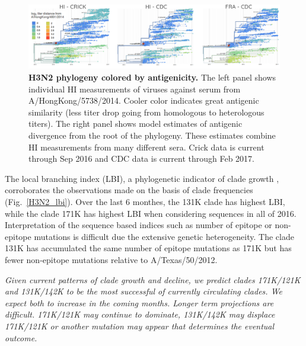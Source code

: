 \documentclass[11pt,oneside,letterpaper]{article}
\begin{document}
\begin{figure}[h!]
	\centering
	\includegraphics[width=1.0\textwidth]{../figures/feb-2017/H3N2_tree_titer_model.png}
	\caption{\textbf{H3N2 phylogeny colored by antigenicity.}
	The left panel shows individual HI measurements of viruses against serum from A/HongKong/5738/2014.
	Cooler color indicates great antigenic similarity (less titer drop going from homologous to heterologous titers).
	The right panel shows model estimates of antigenic divergence from the root of the phylogeny.
	These estimates combine HI measurements from many different sera.
	Crick data is current through Sep 2016 and CDC data is current through Feb 2017.
	}
	\label{H3N2_tree_titer_model}
\end{figure}

The local branching index (LBI), a phylogenetic indicator of clade growth \cite{neher2014predicting}, corroborates the observations made on the basis of clade frequencies (Fig.\ \ref{H3N2_lbi}).
Over the last 6 monthes, the 131K clade has highest LBI, while the clade 171K has highest LBI when considering sequences in all of 2016.
Interpretation of the sequence based indices such as number of epitope or non-epitope mutations \cite{luksza2014predictive} is difficult due the extensive genetic heterogeneity.
The clade 131K has accumulated the same number of epitope mutations as 171K but has fewer non-epitope mutations relative to A/Texas/50/2012.

 \textit{Given current patterns of clade growth and decline, we predict clades 171K/121K and 131K/142K to be the most successful of currently circulating clades. We expect both to increase in the coming months. Longer term projections are difficult. 171K/121K may continue to dominate, 131K/142K may displace 171K/121K or another mutation may appear that determines the eventual outcome.}
\end{document}

